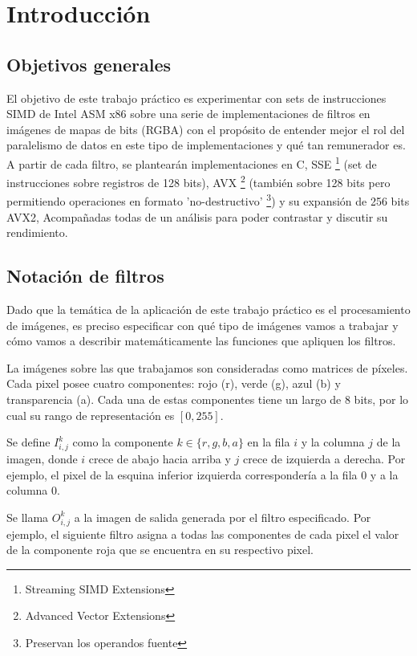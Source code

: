 \section{Introducción}

\subsection{Objetivos generales}

El objetivo de este trabajo práctico es experimentar con sets de instrucciones SIMD de Intel ASM x86 sobre una serie de implementaciones de filtros en imágenes de mapas de bits (RGBA) con el propósito de entender mejor el rol del paralelismo de datos en este tipo de implementaciones y qué tan remunerador es. 
A partir de cada filtro, se plantearán implementaciones en C, SSE \footnote{Streaming SIMD Extensions} (set de instrucciones sobre registros de 128 bits), AVX \footnote{Advanced Vector Extensions} (también sobre 128 bits pero permitiendo operaciones en formato 'no-destructivo' \footnote{Preservan los operandos fuente}) y su expansión de 256 bits AVX2, Acompañadas todas de un análisis para poder contrastar y discutir su rendimiento.

\subsection{Notación de filtros}

Dado que la temática de la aplicación de este trabajo práctico es el procesamiento de imágenes, es preciso especificar con qué tipo de imágenes vamos a trabajar y cómo vamos a describir matemáticamente las funciones que apliquen los filtros.

La imágenes sobre las que trabajamos son consideradas como matrices de píxeles. Cada pixel posee cuatro componentes: rojo (r), verde (g), azul (b) y transparencia (a). Cada una de estas componentes tiene un largo de 8 bits, por lo cual su rango de representación es $[0, 255]$.

Se define $I^k_{i,j}$ como la componente $k \in \{r,g,b,a\}$ en la fila $i$ y la columna $j$ de la imagen, donde $i$ crece de abajo hacia arriba y $j$ crece de izquierda a derecha. Por ejemplo, el pixel de la esquina inferior izquierda correspondería a la fila 0 y a la columna 0.

Se llama $O^k_{i,j}$ a la imagen de salida generada por el filtro especificado. Por ejemplo, el siguiente filtro asigna a todas las componentes de cada pixel el valor de la componente roja que se encuentra en su respectivo pixel.

